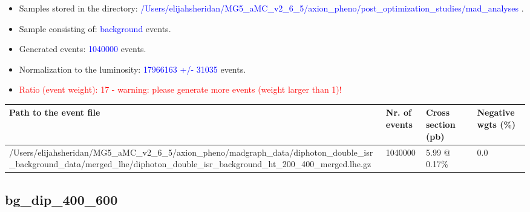 \documentclass[a4paper, 10pt]{article}
\begin{document}
\begin{itemize}
  \item Samples stored in the directory: \textcolor{blue}{/\-Users/\-elijahsheridan/\-MG5\_aMC\_v2\_6\_5/\-axion\_pheno/\-post\_optimization\_studies/\-mad\_analyses} .
   \item Sample consisting of: \textcolor{blue}{background}  events.
   \item Generated events: \textcolor{blue}{1040000 }  events.
   \item Normalization to the luminosity: \textcolor{blue}{17966163}\textcolor{blue}{ +/\-- }\textcolor{blue}{31035 }  events.
   \item\textcolor{red}{Ratio (event weight): }\textcolor{red}{17 }\textcolor{red}{ - warning: please generate more events (weight larger than 1)!}
\textcolor{red}{}
\end{itemize}
\begin{table}[H]
  \begin{center}
    \begin{tabular}{|m{55.0mm}|m{25.0mm}|m{30.0mm}|m{30.0mm}|}
      \hline
      {\cellcolor{yellow}         Path to the event file}& {\cellcolor{yellow}         Nr. of events}& {\cellcolor{yellow}         Cross section (pb)}& {\cellcolor{yellow}         Negative wgts (\%)}\\
      \hline
      {\cellcolor{white}          /\-Users/\-elijahsheridan/\-MG5\_aMC\_v2\_6\_5/\-axion\_pheno/\-madgraph\_data/\-diphoton\_double\_isr\_background\_data/\-merged\_lhe/\-diphoton\_double\_isr\_background\_ht\_200\_400\_merged.lhe.gz}& {\cellcolor{white}          1040000}& {\cellcolor{white}          5.99 @ 0.17\%}& {\cellcolor{white}          0.0}\\
\hline
    \end{tabular}
  \end{center}
\end{table}

\subsection{ bg\_dip\_400\_600}
\end{document}
